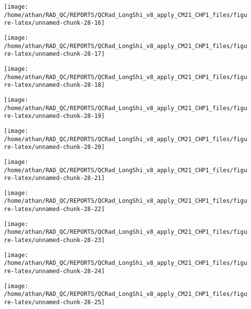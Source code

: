 \documentclass[
  10pt,
  a4paper,oneside]{article}
\begin{document}
\begin{center}\texttt{[image: /home/athan/RAD\_QC/REPORTS/QCRad\_LongShi\_v8\_apply\_CM21\_CHP1\_files/figure-latex/unnamed-chunk-28-16]} \end{center}

\begin{center}\texttt{[image: /home/athan/RAD\_QC/REPORTS/QCRad\_LongShi\_v8\_apply\_CM21\_CHP1\_files/figure-latex/unnamed-chunk-28-17]} \end{center}

\begin{center}\texttt{[image: /home/athan/RAD\_QC/REPORTS/QCRad\_LongShi\_v8\_apply\_CM21\_CHP1\_files/figure-latex/unnamed-chunk-28-18]} \end{center}

\begin{center}\texttt{[image: /home/athan/RAD\_QC/REPORTS/QCRad\_LongShi\_v8\_apply\_CM21\_CHP1\_files/figure-latex/unnamed-chunk-28-19]} \end{center}

\begin{center}\texttt{[image: /home/athan/RAD\_QC/REPORTS/QCRad\_LongShi\_v8\_apply\_CM21\_CHP1\_files/figure-latex/unnamed-chunk-28-20]} \end{center}

\begin{center}\texttt{[image: /home/athan/RAD\_QC/REPORTS/QCRad\_LongShi\_v8\_apply\_CM21\_CHP1\_files/figure-latex/unnamed-chunk-28-21]} \end{center}

\begin{center}\texttt{[image: /home/athan/RAD\_QC/REPORTS/QCRad\_LongShi\_v8\_apply\_CM21\_CHP1\_files/figure-latex/unnamed-chunk-28-22]} \end{center}

\begin{center}\texttt{[image: /home/athan/RAD\_QC/REPORTS/QCRad\_LongShi\_v8\_apply\_CM21\_CHP1\_files/figure-latex/unnamed-chunk-28-23]} \end{center}

\begin{center}\texttt{[image: /home/athan/RAD\_QC/REPORTS/QCRad\_LongShi\_v8\_apply\_CM21\_CHP1\_files/figure-latex/unnamed-chunk-28-24]} \end{center}

\begin{center}\texttt{[image: /home/athan/RAD\_QC/REPORTS/QCRad\_LongShi\_v8\_apply\_CM21\_CHP1\_files/figure-latex/unnamed-chunk-28-25]} \end{center}
\end{document}

